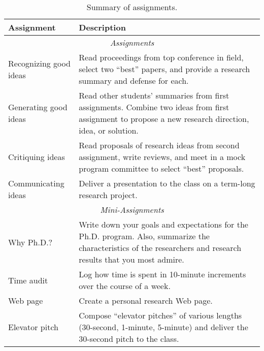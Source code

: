 \begin{table}[t]
\begin{center}
\begin{small}
\begin{tabular}{l|p{2in}}
{\bf Assignment} & {\bf Description} \\ \hline
\multicolumn{2}{c}{{\em Assignments}} \\ \hline
Recognizing good ideas & Read proceedings from top conference in field,
select two ``best'' papers, and provide a research summary and defense
for each. \\
Generating good ideas & Read other students' summaries from first
assignments.  Combine two ideas from first assignment to propose a new
research direction, idea, or solution. \\ 
Critiquing ideas & Read proposals of research ideas from second
assignment, write reviews, and meet in a mock program committee to
select ``best'' proposals. \\
Communicating ideas & Deliver a presentation to the class on a term-long
research project.  \\ \hline
\multicolumn{2}{c}{{\em Mini-Assignments}} \\ \hline
Why Ph.D.? & Write down your goals and expectations for the
Ph.D. program.  Also, summarize the characteristics of the researchers
and research results that you most admire. \\
Time audit & Log how time is spent in 10-minute increments over the
course of a week. \\
Web page & Create a personal research Web page. \\
Elevator pitch & Compose ``elevator pitches'' of various lengths
(30-second, 1-minute,  5-minute) and deliver the 30-second pitch to the
class. 
\end{tabular}
\end{small}
\end{center}
\vspace*{-0.1in}
\caption{Summary of assignments.}
\vspace*{-0.2in}
\label{tab:assignments}
\end{table}

